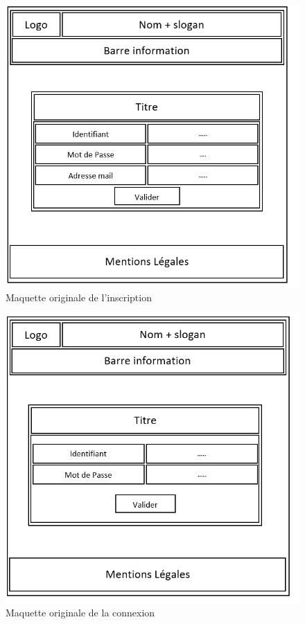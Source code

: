 \documentclass[a4paper,11pt]{article}
\begin{document}
\begin{figure}[H]
  \includegraphics[width=\linewidth]{../Conception/maquette/maquette-inscription-original.png}
  \caption{Maquette originale de l'inscription}
  \label{fig:maquette-inscription-original}
\end{figure}

\begin{figure}[H]
  \includegraphics[width=\linewidth]{../Conception/maquette/maquette-connexion-original.png}
  \caption{Maquette originale de la connexion}
  \label{fig:maquette-connexion-original}
\end{figure}
\end{document}
